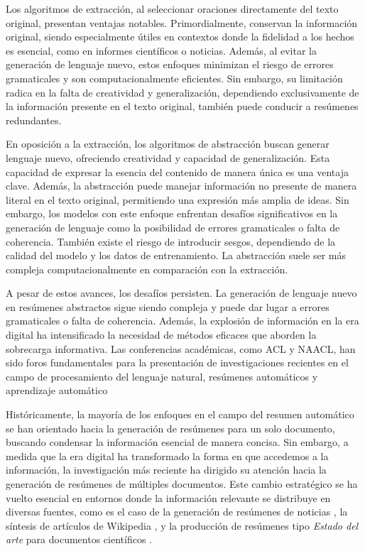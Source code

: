     Los algoritmos de extracción, al seleccionar oraciones directamente del texto original, presentan ventajas notables. Primordialmente, conservan la información original, siendo especialmente útiles en contextos donde la fidelidad a los hechos es esencial, como en informes científicos o noticias. Además, al evitar la generación de lenguaje nuevo, estos enfoques minimizan el riesgo de errores gramaticales y son computacionalmente eficientes. Sin embargo, su limitación radica en la falta de creatividad y generalización, dependiendo exclusivamente de la información presente en el texto original, también puede conducir a resúmenes redundantes.

    En oposición a la extracción, los algoritmos de abstracción buscan generar lenguaje nuevo, ofreciendo creatividad y capacidad de generalización. Esta capacidad de expresar la esencia del contenido de manera única es una ventaja clave. Además, la abstracción puede manejar información no presente de manera literal en el texto original, permitiendo una expresión más amplia de ideas. Sin embargo, los modelos con este enfoque enfrentan desafíos significativos en la generación de lenguaje como la posibilidad de errores gramaticales o falta de coherencia. También existe el riesgo de introducir sesgos, dependiendo de la calidad del modelo y los datos de entrenamiento. La abstracción suele ser más compleja computacionalmente en comparación con la extracción.

    A pesar de estos avances, los desafíos persisten. La generación de lenguaje nuevo en resúmenes abstractos sigue siendo compleja y puede dar lugar a errores gramaticales o falta de coherencia. Además, la explosión de información en la era digital ha intensificado la necesidad de métodos eficaces que aborden la sobrecarga informativa. 
    Las conferencias académicas, como ACL y NAACL, han sido foros fundamentales para la presentación de investigaciones recientes en el campo de procesamiento del lenguaje natural, resúmenes automáticos y aprendizaje automático \cite{acl,naacl}

    Históricamente, la mayoría de los enfoques en el campo del resumen automático se han orientado hacia la generación de resúmenes para un solo documento, buscando condensar la información esencial de manera concisa. Sin embargo, a medida que la era digital ha transformado la forma en que accedemos a la información, la investigación más reciente ha dirigido su atención hacia la generación de resúmenes de múltiples documentos. Este cambio estratégico se ha vuelto esencial en entornos donde la información relevante se distribuye en diversas fuentes, como es el caso de la generación de resúmenes de noticias \cite{fabbri2019multi-news}, la síntesis de artículos de Wikipedia \cite{liu2018}, y la producción de resúmenes tipo \emph{Estado del arte} para documentos científicos \cite{lu2020multixscience}.

